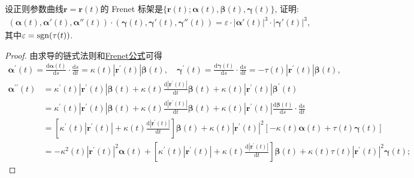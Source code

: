 \documentclass[../../main.tex]{subfiles}%
\begin{document}
\begin{example}
设正则参数曲线$\bm{r} = \bm{r}(t)$的 Frenet 标架是$\{\bm{r}(t); \bm{\alpha}(t), \bm{\beta}(t), \bm{\gamma}(t)\}$, 证明:
\begin{align*}
(\bm{\alpha}(t), \bm{\alpha}'(t), \bm{\alpha}''(t)) \cdot (\bm{\gamma}(t), \bm{\gamma}'(t), \bm{\gamma}''(t)) = \varepsilon \cdot |\bm{\alpha}'(t)|^3 \cdot |\bm{\gamma}'(t)|^3,
\end{align*}
其中$\varepsilon = \operatorname{\operatorname{sgn}}(\tau(t))$.
\end{example}
\begin{proof}

由求导的链式法则和\hyperref[theorem:微分几何-Frenet公式]{Frenet公式}可得
\begin{align*}
\bm{\alpha}^\prime\left(t\right)=\frac{\mathrm{d}\bm{\alpha}\left(t\right)}{\mathrm{d}s}\cdot\frac{\mathrm{d}s}{\mathrm{d}t}=\kappa\left(t\right)\left|\bm{r}^\prime\left(t\right)\right|\bm{\beta}\left(t\right),
\quad 
\bm{\gamma}^\prime\left(t\right)=\frac{\mathrm{d}\bm{\gamma}\left(t\right)}{\mathrm{d}s}\cdot\frac{\mathrm{d}s}{\mathrm{d}t}=-\tau\left(t\right)\left|\bm{r}^\prime\left(t\right)\right|\bm{\beta}\left(t\right),
\end{align*}
\begin{align*}
\bm{\alpha}^{\prime\prime}\left(t\right)&=\kappa^\prime\left(t\right)\left|\bm{r}^\prime\left(t\right)\right|\bm{\beta}\left(t\right)+\kappa\left(t\right)\frac{\mathrm{d}\left|\bm{r}^\prime\left(t\right)\right|}{\mathrm{d}t}\bm{\beta}\left(t\right)+\kappa\left(t\right)\left|\bm{r}^\prime\left(t\right)\right|\bm{\beta}^\prime\left(t\right)\\
&=\kappa^\prime\left(t\right)\left|\bm{r}^\prime\left(t\right)\right|\bm{\beta}\left(t\right)+\kappa\left(t\right)\frac{\mathrm{d}\left|\bm{r}^\prime\left(t\right)\right|}{\mathrm{d}t}\bm{\beta}\left(t\right)+\kappa\left(t\right)\left|\bm{r}^\prime\left(t\right)\right|\frac{\mathrm{d}\bm{\beta}\left(t\right)}{\mathrm{d}s}\cdot\frac{\mathrm{d}s}{\mathrm{d}t}\\
&=\left[\kappa^\prime\left(t\right)\left|\bm{r}^\prime\left(t\right)\right|+\kappa\left(t\right)\frac{\mathrm{d}\left|\bm{r}^\prime\left(t\right)\right|}{\mathrm{d}t}\right]\bm{\beta}\left(t\right)+\kappa\left(t\right)\left|\bm{r}^\prime\left(t\right)\right|^2\left[-\kappa\left(t\right)\bm{\alpha}\left(t\right)+\tau\left(t\right)\bm{\gamma}\left(t\right)\right]\\
&=-\kappa^2\left(t\right)\left|\bm{r}^\prime\left(t\right)\right|^2\bm{\alpha}\left(t\right)+\left[\kappa^\prime\left(t\right)\left|\bm{r}^\prime\left(t\right)\right|+\kappa\left(t\right)\frac{\mathrm{d}\left|\bm{r}^\prime\left(t\right)\right|}{\mathrm{d}t}\right]\bm{\beta}\left(t\right)+\kappa\left(t\right)\tau\left(t\right)\left|\bm{r}^\prime\left(t\right)\right|^2\bm{\gamma}\left(t\right);

\end{align*}
\end{proof}
\end{document}
